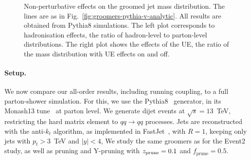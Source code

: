 \begin{figure}[t!]
  \hfill%
  \caption{Non-perturbative effects on the groomed jet mass
    distribution. The lines are as in
    Fig.~\ref{fig:groomers-pythia-v-analytic}. All results are
    obtained from Pythia8 simulations. The left plot corresponds to
    hadronisation effects, \ie the ratio of hadron-level to
    parton-level distributions. The right plot shows the effects of the
    UE, \ie the ratio of the mass distribution with UE
    effects on and off.}\label{fig:groomers-pythia-npeffects}
\end{figure}

\paragraph{Setup.}
%
We now compare our all-order results, including running coupling, to a
full parton-shower simulation.
%
For this, we use the Pythia8~\cite{Sjostrand:2014zea} generator, in
its Monash13 tune~\cite{Skands:2014pea} at parton level. We generate
dijet events at $\sqrt{s}=13$~TeV, restricting the hard matrix element
to $qq\to qq$ processes.
%
Jets are reconstructed with the anti-$k_t$ algorithm, as implemented
in FastJet~\cite{Cacciari:2005hq,Cacciari:2011ma}, with $R=1$,
keeping only jets with $p_t>3$~TeV and $|y|<4$,
%
We study the same groomers as for the Event2 study, as well as pruning
and Y-pruning with $z_{\text{prune}}=0.1$ and $f_\text{prune}=0.5$.

